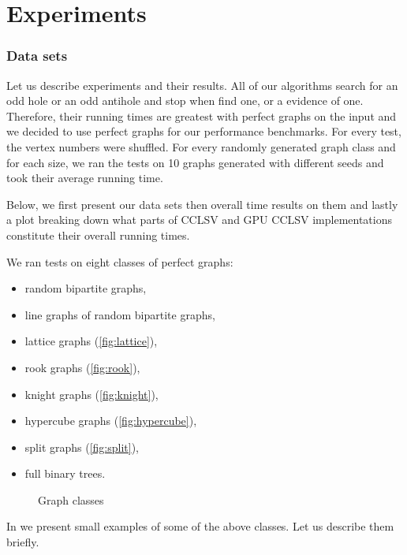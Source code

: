 \section{Experiments}
\label{sec:experiments}

\subsubsection{Data sets}

Let us describe experiments and their results. All of our algorithms search for an odd hole or an odd antihole and stop when find one, or a evidence of one. Therefore, their running times are greatest with perfect graphs on the input and we decided to use perfect graphs for our performance benchmarks. For every test, the vertex numbers were shuffled. For every randomly generated graph class and for each size, we ran the tests on 10 graphs generated with different seeds and took their average running time.

Below, we first present our data sets then overall time results on them and lastly a plot breaking down what parts of CCLSV and GPU CCLSV implementations constitute their overall running times.

We ran tests on eight classes of perfect graphs:
\begin{itemize}
  \item random bipartite graphs,
  \item line graphs of random bipartite graphs,
  \item lattice graphs (\cref{fig:lattice}),
  \item rook graphs (\cref{fig:rook}),
  \item knight graphs (\cref{fig:knight}),
  \item hypercube graphs (\cref{fig:hypercube}),
  \item split graphs (\cref{fig:split}),
  \item full binary trees.
\end{itemize}


\begin{figure}
  
  \caption{Graph classes}
  \label{fig:graphClasses}
\end{figure}

In  we present small examples of some of the above classes. Let us describe them briefly.

